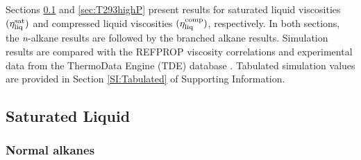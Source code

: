 \documentclass[preprint,review,12pt]{elsarticle}
\begin{document}
	Sections \ref{sec:eta_sat} and \ref{sec:T293highP} present results for saturated liquid viscosities $(\eta_{\rm liq}^{\rm sat})$ and compressed liquid viscosities $(\eta_{\rm liq}^{\rm comp})$, respectively. In both sections, the \textit{n}-alkane results are followed by the branched alkane results. Simulation results are compared with the REFPROP viscosity correlations and experimental data from the ThermoData Engine (TDE) database \cite{TDE}. Tabulated simulation values are provided in Section \ref{SI:Tabulated} of Supporting Information.
	
	\subsection{Saturated Liquid} \label{sec:eta_sat}
	
	\subsubsection{Normal alkanes}
	
	
	
	
\end{document}
